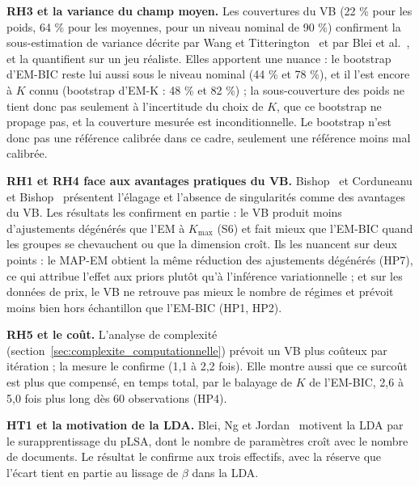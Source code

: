 \textbf{RH3 et la variance du champ moyen.} Les couvertures du VB (22 \% pour les poids, 64 \% pour les moyennes, pour un niveau nominal de 90 \%) confirment la sous-estimation de variance décrite par Wang et Titterington~\cite{wang2005} et par Blei et al.~\cite{blei2017}, et la quantifient sur un jeu réaliste. Elles apportent une nuance : le bootstrap d'EM-BIC reste lui aussi sous le niveau nominal (44 \% et 78 \%), et il l'est encore à $K$ connu (bootstrap d'EM-K : 48 \% et 82 \%) ; la sous-couverture des poids ne tient donc pas seulement à l'incertitude du choix de $K$, que ce bootstrap ne propage pas, et la couverture mesurée est inconditionnelle. Le bootstrap n'est donc pas une référence calibrée dans ce cadre, seulement une référence moins mal calibrée.

\textbf{RH1 et RH4 face aux avantages pratiques du VB.} Bishop~\cite{bishop2006} et Corduneanu et Bishop~\cite{corduneanu2001} présentent l'élagage et l'absence de singularités comme des avantages du VB. Les résultats les confirment en partie : le VB produit moins d'ajustements dégénérés que l'EM à $K_{\max}$ (S6) et fait mieux que l'EM-BIC quand les groupes se chevauchent ou que la dimension croît. Ils les nuancent sur deux points : le MAP-EM obtient la même réduction des ajustements dégénérés (HP7), ce qui attribue l'effet aux priors plutôt qu'à l'inférence variationnelle ; et sur les données de prix, le VB ne retrouve pas mieux le nombre de régimes et prévoit moins bien hors échantillon que l'EM-BIC (HP1, HP2).

\textbf{RH5 et le coût.} L'analyse de complexité (section~\ref{sec:complexite_computationnelle}) prévoit un VB plus coûteux par itération ; la mesure le confirme (1,1 à 2,2 fois). Elle montre aussi que ce surcoût est plus que compensé, en temps total, par le balayage de $K$ de l'EM-BIC, 2,6 à 5,0 fois plus long dès 60 observations (HP4).

\textbf{HT1 et la motivation de la LDA.} Blei, Ng et Jordan~\cite{blei2003} motivent la LDA par le surapprentissage du pLSA, dont le nombre de paramètres croît avec le nombre de documents. Le résultat le confirme aux trois effectifs, avec la réserve que l'écart tient en partie au lissage de $\beta$ dans la LDA.

